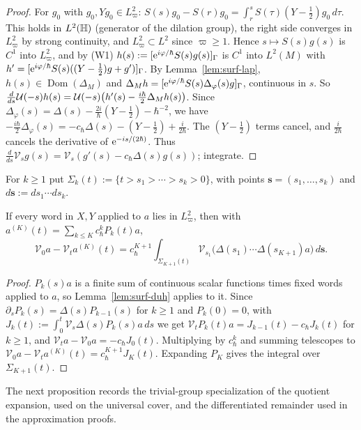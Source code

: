 \begin{proof}
For $g_0$ with $g_0,Yg_0\in L^2_\varpi$: $S(s)g_0-S(r)g_0=\int_r^sS(\tau)(Y-\tfrac12)g_0\,d\tau$. This holds in $L^2(\mathbb{H})$ (generator of the dilation group), the right side converges in $L^2_\varpi$ by strong continuity, and $L^2_\varpi\subset L^2$ since $\varpi\ge1$.
Hence $s\mapsto S(s)g(s)$ is $C^1$ into $L^2_\varpi$, and by (W1) $h(s):=[\mathrm{e}^{i\varphi/\hbar}S(s)g(s)]_\Gamma$ is $C^1$ into $L^2(M)$ with $h'=[\mathrm{e}^{i\varphi/\hbar}S(s)((Y-\tfrac12)g+g')]_\Gamma$.
By Lemma~\ref{lem:surf-lap}, $h(s)\in\operatorname{Dom}(\Delta_M)$ and $\Delta_Mh=[\mathrm{e}^{i\varphi/\hbar}S(s)\Delta_\varphi(s)g]_\Gamma$, continuous in $s$. So $\tfrac{d}{ds}\mathcal{U}(-s)h(s)=\mathcal{U}(-s)\bigl(h'(s)-\tfrac{i\hbar}{2}\Delta_Mh(s)\bigr)$.
Since $\Delta_\varphi(s)=\Delta(s)-\tfrac{2i}{\hbar}(Y-\tfrac12)-\hbar^{-2}$, we have $-\tfrac{i\hbar}{2}\Delta_\varphi(s)=-c_\hbar\Delta(s)-(Y-\tfrac12)+\tfrac{i}{2\hbar}$. The $(Y-\tfrac12)$ terms cancel, and $\tfrac{i}{2\hbar}$ cancels the derivative of $\mathrm{e}^{-is/(2\hbar)}$. Thus $\tfrac{d}{ds}\mathcal V_sg(s)=\mathcal V_s(g'(s)-c_\hbar\Delta(s)g(s))$; integrate.\qedhere
\end{proof}

For $k\ge1$ put $\Sigma_k(t):=\{t>s_1>\cdots>s_k>0\}$, with points $\mathbf s=(s_1,\dots,s_k)$ and $d\mathbf s:=ds_1\cdots ds_k$.
\begin{corollary}\label{cor:surf-dyson}
If every word in $X,Y$ applied to $a$ lies in $L^2_\varpi$, then with $a^{(K)}(t)=\sum_{k\le K}c_\hbar^kP_k(t)a$,
\[
\mathcal V_0a-\mathcal V_ta^{(K)}(t)=c_\hbar^{K+1}\int_{\Sigma_{K+1}(t)}\mathcal V_{s_1}\bigl(\Delta(s_1)\cdots\Delta(s_{K+1})a\bigr)\,d\mathbf s.
\]
\end{corollary}

\begin{proof}
$P_k(s)a$ is a finite sum of continuous scalar functions times fixed words applied to $a$, so Lemma~\ref{lem:surf-duh} applies to it. Since $\partial_sP_{k}(s)=\Delta(s)P_{k-1}(s)$ for $k\ge1$ and $P_k(0)=0$, with $J_k(t):=\int_0^t\mathcal V_s\Delta(s)P_k(s)a\,ds$ we get $\mathcal V_tP_k(t)a=J_{k-1}(t)-c_\hbar J_k(t)$ for $k\ge1$, and $\mathcal V_ta-\mathcal V_0a=-c_\hbar J_0(t)$. Multiplying by $c_\hbar^k$ and summing telescopes to $\mathcal V_0a-\mathcal V_ta^{(K)}(t)=c_\hbar^{K+1}J_K(t)$. Expanding $P_K$ gives the integral over $\Sigma_{K+1}(t)$.
\end{proof}


The next proposition records the trivial-group specialization of the quotient expansion, used on the universal cover,
and the differentiated remainder used in the approximation proofs.


